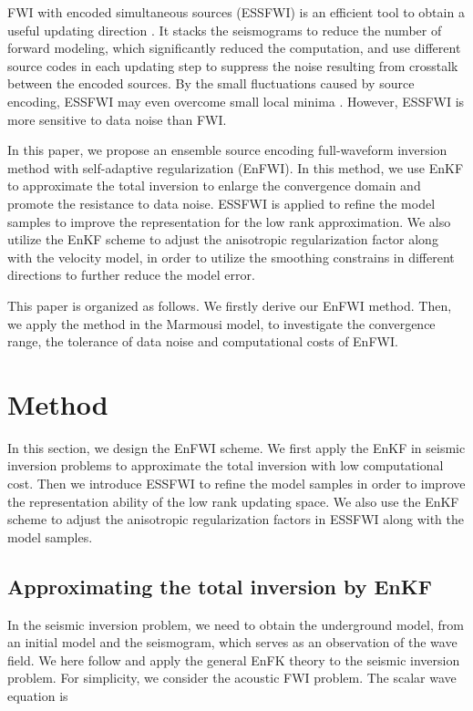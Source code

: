 \documentclass[mreferee]{gji}
\begin{document}
FWI with encoded simultaneous sources (ESSFWI) is an efficient tool to obtain a useful updating direction \cite{kr,be,ca}. It stacks the seismograms to reduce the number of forward modeling, which significantly reduced the computation, and use different source codes in each updating step to suppress the noise resulting from crosstalk between the encoded sources. By the small fluctuations caused by source encoding, ESSFWI may even overcome small local minima \cite{ca}. However, ESSFWI is more sensitive to data noise \cite{kr} than FWI.

In this paper, we propose an ensemble source encoding full-waveform inversion method with self-adaptive regularization (EnFWI). In this method, we use EnKF to approximate the total inversion to enlarge the convergence domain and promote the resistance to data noise. ESSFWI is applied to refine the model samples to improve the representation for the low rank approximation. We also utilize the EnKF scheme to adjust the anisotropic regularization factor along with the velocity model, in order to utilize the smoothing constrains in different directions to further reduce the model error.

This paper is organized as follows. We firstly derive our EnFWI method. Then, we apply the method in the Marmousi model, to investigate the convergence range, the tolerance of data noise and computational costs of EnFWI.


\section{Method}

In this section, we design the EnFWI scheme. We first apply the EnKF in seismic inversion problems to approximate the total inversion with low computational cost. Then we introduce ESSFWI to refine the model samples in order to improve the representation ability of the low rank updating space. We also use the EnKF scheme to adjust the anisotropic regularization factors in ESSFWI along with the model samples.

\subsection{Approximating the total inversion by EnKF}

In the seismic inversion problem, we need to obtain the underground model, from an initial model and the seismogram, which serves as an observation of the wave field. We here follow \cite{ev03} and apply the general EnFK theory to the seismic inversion problem.
For simplicity, we consider the acoustic FWI problem. The scalar wave equation is
\end{document}
